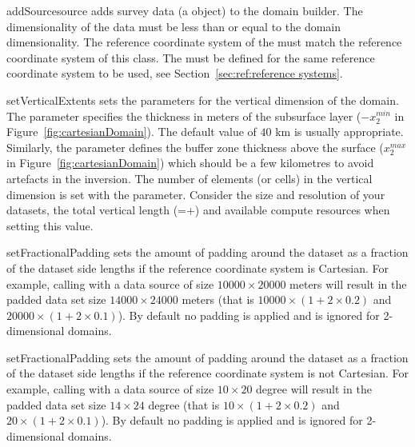 \begin{methoddesc}[DomainBuilder]{addSource}{source}
adds survey data  (a  object) to the domain
builder. The dimensionality of the data must be less than or equal to the
domain dimensionality. The reference coordinate system of the 
must match the reference coordinate system of this class. 
The  must be defined for the same reference coordinate system to be used, see Section~\ref{sec:ref:reference systems}.
\end{methoddesc}

\begin{methoddesc}[DomainBuilder]{setVerticalExtents}{%
%
%
}
sets the parameters for the vertical dimension of the domain. The parameter
 specifies the thickness in meters of the subsurface layer
($-x_2^{min}$ in Figure~\ref{fig:cartesianDomain}).
The default value of $40$ km is usually appropriate. Similarly, the
 parameter defines the buffer zone thickness above the surface
($x_2^{max}$ in Figure~\ref{fig:cartesianDomain}) which should be a few
kilometres to avoid artefacts in the inversion.
The number of elements (or cells) in the vertical dimension is set with the
 parameter. Consider the size and resolution of your datasets,
the total vertical length (=+) and available
compute resources when setting this value.
\end{methoddesc}

\begin{methoddesc}[DomainBuilder]{setFractionalPadding}{%
%
}
sets the amount of padding around the dataset as a fraction of the dataset side
lengths if the reference coordinate system is Cartesian. 
For example, calling  with a data source
of size $10000 \times 20000$ meters will result in the padded data set size $14000 \times 24000$ meters
(that is $10000 \times (1+2 \times 0.2)$ and $20000 \times (1+2 \times 0.1)$).
By default no padding is applied and  is ignored for 2-dimensional
domains.
\end{methoddesc}

\begin{methoddesc}[DomainBuilder]{setFractionalPadding}{%
%
}
sets the amount of padding around the dataset as a fraction of the dataset side
lengths if the reference coordinate system is not Cartesian.
For example, calling  with a data source
of size $10 \times 20$ degree will result in the padded data set size $14 \times 24$ degree
(that is $10 \times (1+2 \times 0.2)$ and $20 \times (1+2 \times 0.1)$).
By default no padding is applied and  is ignored for 2-dimensional
domains.
\end{methoddesc}

